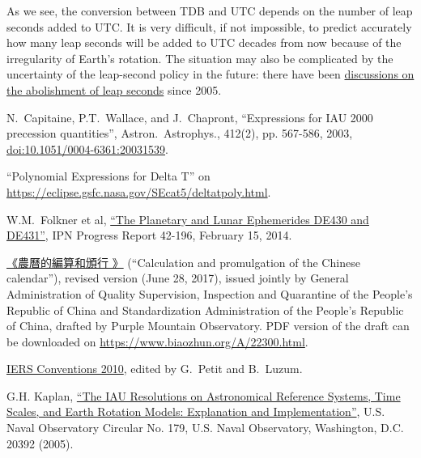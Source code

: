 \documentclass[12pt]{article}
\begin{document}
\begin{CJK}{UTF8}{bkai}
As we see, the conversion between TDB and UTC depends on the number of 
leap seconds added to UTC. It is very difficult, if not impossible, to 
predict accurately how many leap seconds will be added to UTC decades from now because 
of the irregularity of Earth's rotation. The situation may also be complicated 
by the uncertainty of the leap-second policy in the future: there have been 
\href{https://en.wikipedia.org/wiki/Leap_second#Proposal_to_abolish_leap_seconds}
{discussions on the abolishment of leap seconds} since 2005.

\begin{thebibliography}{Urban \& Seidelmann 2013}

 N.~Capitaine, P.T.~Wallace, 
and J.~Chapront, ``Expressions for IAU 2000
precession quantities'', Astron.\ Astrophys., 412(2), pp. 567-586, 2003,
\href{https://www.aanda.org/articles/aa/abs/2003/48/aa4068/aa4068.html}
{doi:10.1051/0004-6361:20031539}.

 ``Polynomial Expressions for Delta T'' on 
\href{https://eclipse.gsfc.nasa.gov/SEcat5/deltatpoly.html}{https://eclipse.gsfc.nasa.gov/SEcat5/deltatpoly.html}.

 W.M.~Folkner et al, 
\href{https://naif.jpl.nasa.gov/pub/naif/generic_kernels/spk/planets/de430_and_de431.pdf}{``The Planetary and Lunar Ephemerides DE430 and DE431''}, 
IPN Progress Report 42-196, February 15, 2014.

 \href{http://www.nongli.net/cn/11028.html}{《農曆的編算和頒行
》}
(``Calculation and promulgation of the Chinese calendar''), revised version (June 28, 2017),
issued jointly by General Administration of Quality Supervision,
Inspection and Quarantine of the People's Republic of China and
Standardization Administration of the People's Republic of China,
drafted by Purple Mountain Observatory. PDF version of the draft can be downloaded
on \href{https://www.biaozhun.org/A/22300.html}{https://www.biaozhun.org/A/22300.html}.

 \href{http://iers-conventions.obspm.fr/2010/2010_official/tn36.pdf}{IERS Conventions 2010}, 
edited by G.~Petit and B.~Luzum.

 G.H. Kaplan, \href{http://aa.usno.navy.mil/publications/docs/Circular_179.pdf}
{``The IAU Resolutions on Astronomical Reference Systems, Time Scales, 
and Earth Rotation Models: Explanation and Implementation''}, U.S. Naval 
Observatory Circular No. 179, U.S. Naval Observatory, Washington, D.C. 20392 (2005).


\end{thebibliography}
\end{CJK}
\end{document}
